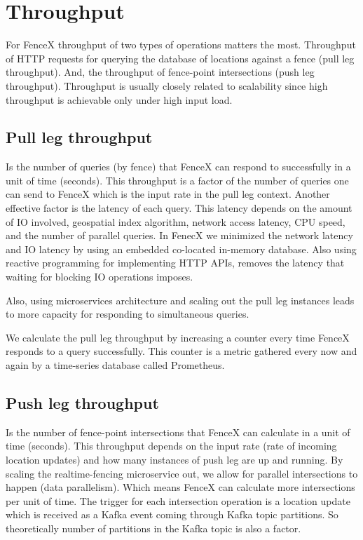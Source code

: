 \documentclass[a4]{report}
\begin{document}
    \section{Throughput}
    For FenceX throughput of two types of operations matters the most.
    Throughput of HTTP requests for querying the database of locations against a fence (pull leg throughput).
    And, the throughput of fence-point intersections (push leg throughput).
    Throughput is usually closely related to scalability since high throughput is achievable only under high input load.

    \subsection{Pull leg throughput}
    Is the number of queries (by fence) that FenceX can respond to successfully in a unit of time (seconds).
    This throughput is a factor of the number of queries one can send to FenceX which is the input rate in the pull leg context.
    Another effective factor is the latency of each query.
    This latency depends on the amount of IO involved, geospatial index algorithm, network access latency, CPU speed, and the number of parallel queries.
    In FenecX we minimized the network latency and IO latency by using an embedded co-located in-memory database.
    Also using reactive programming for implementing HTTP APIs, removes the latency that waiting for blocking IO
    operations imposes.

    Also, using microservices architecture and scaling out the pull leg instances leads to more capacity for responding
    to simultaneous queries.

    We calculate the pull leg throughput by increasing a counter every time FenceX responds to a query successfully.
    This counter is a metric gathered every now and again by a time-series database called Prometheus\cite{prometheus}.

    \subsection{Push leg throughput}
    Is the number of fence-point intersections that FenceX can calculate in a unit of time (seconds).
    This throughput depends on the input rate (rate of incoming location updates) and how many instances of push leg are up and running.
    By scaling the realtime-fencing microservice out, we allow for parallel intersections to happen (data parallelism).
    Which means FenceX can calculate more intersections per unit of time.
    The trigger for each intersection operation is a location update which is received as a Kafka event coming through Kafka topic partitions.
    So theoretically number of partitions in the Kafka topic is also a factor.
\end{document}
